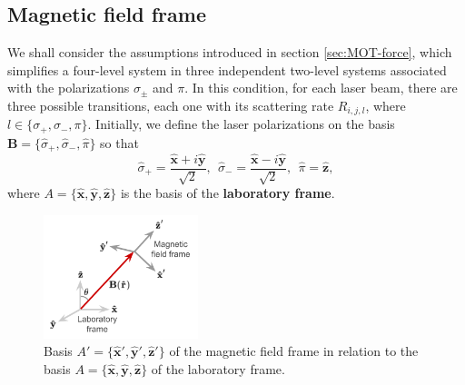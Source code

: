 \subsection{Magnetic field frame}
\label{sec:magnetic-field-frame}

We shall consider the assumptions introduced in section \ref{sec:MOT-force}, which simplifies a four-level system in three independent two-level systems associated with the polarizations $ \sigma_{\pm} $ and $ \pi $. In this condition, for each laser beam, there are three possible transitions, each one with its scattering rate $ R_{i,j,l} $, where $ l \in \{\sigma_{+}, \sigma_{-}, \pi \} $. Initially, we define the laser polarizations on the basis $ \mathbf{B} = \{\hat{\sigma}_{+}, \hat{\sigma}_{-}, \hat{\pi} \} $ so that
\begin{equation}
    \hat{\sigma}_+ = \frac{\mathbf{\hat{x}} + i\mathbf{\hat{y}}}{\sqrt{2}},\ \ \hat{\sigma}_- = \frac{\mathbf{\hat{x}} - i\mathbf{\hat{y}}}{\sqrt{2}},\ \ \hat{\pi} = \mathbf{\hat{z}},
\end{equation}
where $ A = \{\mathbf{\hat{x}}, \mathbf{\hat{y}}, \mathbf{\hat{z}}\} $ is the basis of the \textbf{laboratory frame}.
\begin{figure}[!ht]
    \centering
    \includegraphics[width=0.4\textwidth]{USPSC-img/polarization_basis.png}
    \vspace{5px}
    \caption{Basis $ A' = \{\mathbf{\hat{x}}', \mathbf{\hat{y}}', \mathbf{\hat{z}}'\} $ of the magnetic field frame in relation to the basis $ A = \{\mathbf{\hat{x}}, \mathbf{\hat{y}}, \mathbf{\hat{z}}\} $ of the laboratory frame.}
    \label{fig:magnetic-field-frame}
\end{figure}

